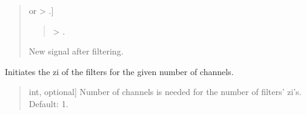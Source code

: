 \documentclass[letterpaper,10pt,english]{sphinxmanual}
\begin{document}
\begin{fulllineitems}
\begin{fulllineitems}
\begin{quote}
\begin{description}
\begin{description}
\end{description}

\begin{description}
\sphinxlineitem{\sphinxstylestrong{new\_sig}}{[} or  \sphinxhyphen{}\textgreater{} .{]}\begin{quote}

\sphinxAtStartPar
{} \sphinxhyphen{}\textgreater{} .
\end{quote}

\sphinxAtStartPar
New signal after filtering.

\end{description}

\end{description}\end{quote}

\end{fulllineitems}


\begin{fulllineitems}
\label{\detokenize{classes:dsptoolbox.classes.filterbank.FilterBank.initialize_zi}}
\pysigstartsignatures
{}
\pysigstopsignatures
\sphinxAtStartPar
Initiates the zi of the filters for the given number of channels.
\begin{quote}\begin{description}
\begin{description}
\sphinxlineitem{\sphinxstylestrong{number\_of\_channels}}{[}int, optional{]}
\sphinxAtStartPar
Number of channels is needed for the number of filters’ zi’s.
Default: 1.

\end{description}

\end{description}\end{quote}

\end{fulllineitems}


\end{fulllineitems}
\end{document}
